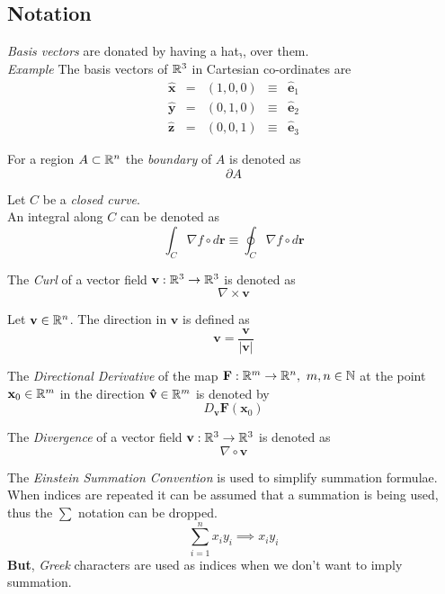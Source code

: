\documentclass[11pt,a4paper]{article}
\begin{document}
\subsection{Notation}

\textit{Basis vectors} are donated by having a hat,$\hat{}$, over them.\\
\textit{Example} The basis vectors of $\mathbb{R}^3$ in Cartesian co-ordinates are
\[\begin{array}{rcccl}
\hat{\textbf{x}} &=& (1,0,0) &\equiv& \hat{\textbf{e}}_1\\
\hat{\textbf{y}} &=& (0,1,0) &\equiv& \hat{\textbf{e}}_2\\
\hat{\textbf{z}} &=& (0,0,1) &\equiv& \hat{\textbf{e}}_3
\end{array}\]

For a region $A\subset\mathbb{R}^n$ the \textit{boundary} of $A$ is denoted as
$$\partial A$$

Let $C$ be a \textit{closed curve}.\\
An integral along $C$ can be denoted as
$$\int_C\nabla f\circ d\textbf{r}\equiv\oint_C\nabla f\circ d\textbf{r}$$

The \textit{Curl} of a vector field $\textbf{v}:\mathbb{R}^3\to\mathbb{R}^3$ is denoted as
$$\nabla\times\textbf{v}$$

Let $\textbf{v}\in\mathbb{R}^n$. The direction in $\textbf{v}$ is defined as
$$\textbf{\^v}=\dfrac{\textbf{v}}{|\textbf{v}|}$$

The \textit{Directional Derivative} of the map $\textbf{F}:\mathbb{R}^m\to\mathbb{R}^n,\ m,n\in\mathbb{N}$ at the point $\textbf{x}_0\in\mathbb{R}^m$ in the direction $\textbf{\^v}\in\mathbb{R}^m$ is denoted by
$$D_\textbf{\^v}\textbf{F}(\textbf{x}_0)$$

The \textit{Divergence} of a vector field $\textbf{v}:\mathbb{R}^3\to\mathbb{R}^3$ is denoted as
$$\nabla\circ\textbf{v}$$

The \textit{Einstein Summation Convention} is used to simplify summation formulae.\\
When indices are repeated it can be assumed that a summation is being used, thus the $\sum$ notation can be dropped.
$$\sum_{i=1}^nx_iy_i\implies x_iy_i$$
\textbf{But}, \textit{Greek} characters are used as indices when we don't want to imply summation.\\
\end{document}
